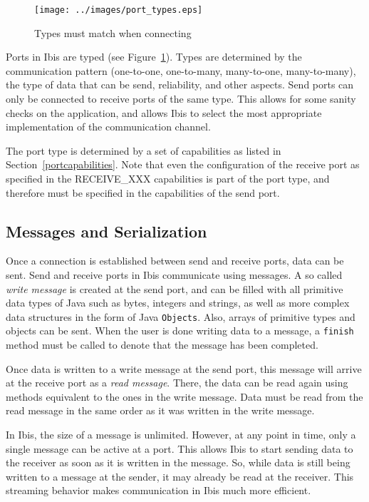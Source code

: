 \documentclass[10pt]{article}
\begin{document}
\begin{figure} \centering
\texttt{[image: ../images/port\_types.eps]}
\caption{\label{port_types}Types must match when connecting} 
\end{figure}

Ports in Ibis are typed (see Figure~\ref{port_types}). Types are
determined by the communication pattern (one-to-one, one-to-many,
many-to-one, many-to-many), the type of data that can be send,
reliability, and other aspects. Send ports can only be connected to receive
ports of the same type. This allows for some sanity checks on the
application, and allows Ibis to select the most appropriate
implementation of the communication channel.

The port type is determined by a set of capabilities as listed in  
Section~\ref{portcapabilities}.
Note that even the configuration of the receive port as  
specified in the RECEIVE\_XXX capabilities is part of the port type,  
and therefore must be specified in the capabilities of the send port.

\subsection{Messages and Serialization}


Once a connection is established between send and receive ports, data
can be sent. Send and receive ports in Ibis communicate using
messages. A so called \emph{write message} is created at the send port,
and can be filled with all primitive data types of Java such as bytes, integers
and strings, as well as more complex data structures in the form of
Java \texttt{Objects}. Also, arrays of primitive types and objects can be
sent. When the user is done writing data to a message, a \texttt{finish}
method must be called to denote that the message has been completed.

Once data is written to a write message at the send port, this message
will arrive at the receive port as a \emph{read message}. There, the
data can be read again using methods equivalent to the ones in the write
message. Data must be read from the read message in the same order as it
was written in the write message.

In Ibis, the size of a message is unlimited. However, at any point in
time, only a single message can be active at a port. This allows Ibis to
start sending data to the receiver as soon as it is written in the
message. So, while data is still being written to a message at the
sender, it may already be read at the receiver. This streaming behavior
makes communication in Ibis much more efficient.
\end{document}
